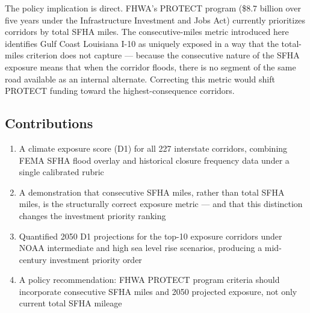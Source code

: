 The policy implication is direct. FHWA's PROTECT program (\$8.7 billion over five years
under the Infrastructure Investment and Jobs Act) currently prioritizes corridors by total
SFHA miles. The consecutive-miles metric introduced here identifies Gulf Coast Louisiana
I-10 as uniquely exposed in a way that the total-miles criterion does not capture --- because
the consecutive nature of the SFHA exposure means that when the corridor floods, there is no
segment of the same road available as an internal alternate. Correcting this metric would
shift PROTECT funding toward the highest-consequence corridors.

\subsection*{Contributions}

\begin{enumerate}
\item A climate exposure score (D1) for all 227 interstate corridors, combining FEMA SFHA
flood overlay and historical closure frequency data under a single calibrated rubric
\item A demonstration that consecutive SFHA miles, rather than total SFHA miles, is the
structurally correct exposure metric --- and that this distinction changes the investment
priority ranking
\item Quantified 2050 D1 projections for the top-10 exposure corridors under NOAA intermediate
and high sea level rise scenarios, producing a mid-century investment priority order
\item A policy recommendation: FHWA PROTECT program criteria should incorporate consecutive
SFHA miles and 2050 projected exposure, not only current total SFHA mileage
\end{enumerate}
